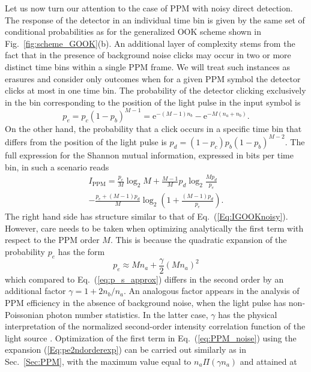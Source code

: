 \documentclass[conference]{IEEEtran}
\newcommand{\Eul}{\mathrm{e}}
\begin{document}
Let us now turn our attention to the case of PPM with noisy direct detection. The response of the detector in an individual time bin is given by the same set of conditional probabilities as for the generalized OOK scheme shown in Fig.~\ref{fig:scheme_GOOK}(b). An additional layer of complexity stems from the fact that in the presence of background noise clicks may occur in two or more distinct time bins within a single PPM frame. We will treat such instances as erasures and consider only outcomes when for a given PPM symbol the detector clicks at most in one time bin. The probability of the detector clicking exclusively in the bin corresponding to the position of the light pulse in the input symbol is
\begin{equation}
p_e = p_c (1-p_b)^{M-1} = \Eul^{-(M-1)n_b} - \Eul^{-M(n_a+ n_b)}.
\end{equation}
On the other hand, the probability that a click occurs in a specific time bin that differs from the position of the light pulse is
$p_d =  (1-p_c) p_b(1-p_b)^{M-2}$.
The full expression for the Shannon mutual information, expressed in bits per time bin, in such a scenario reads
\begin{multline}\label{eq:PPM_noise}
I_{\text{PPM}} = \frac{p_e}{M} \log_2 M  + \frac{M-1}{M} p_d \log_2 \frac{Mp_d}{p_e} \\
- \frac{p_e+(M-1)p_d}{M} \log_2 \left(1+\frac{(M-1)p_d}{p_e} \right).
\end{multline}
The right hand side has structure similar to that of Eq.~(\ref{Eq:IGOOKnoisy}). However, care needs to be taken when optimizing analytically the first term with respect to the PPM order $M$. This is because the quadratic expansion of the probability $p_e$ has the form
\begin{equation}
p_e \approx M n_{a} + \frac{\gamma}{2} (M n_{a})^2
\label{Eq:pe2ndorderexp}
\end{equation}
which compared to Eq.~(\ref{eq:p_s_approx}) differs in the second order by an additional factor $\gamma = 1 + 2 n_b/ n_{a}$. An analogous factor appears in the analysis of PPM efficiency in the absence of background noise, when the light pulse has non-Poissonian photon number statistics. In the latter case, $\gamma$ has the physical interpretation of the normalized second-order intensity correlation function of the light source \cite{Jarzyna2015}. Optimization of the first term in Eq.~(\ref{eq:PPM_noise})
using the expansion (\ref{Eq:pe2ndorderexp}) can be carried out similarly as in Sec.~\ref{Sec:PPM}, with the maximum value equal to $n_a \Pi (\gamma n_a)$ and attained at
\end{document}
